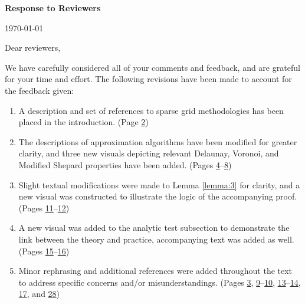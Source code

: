 
\setcounter{page}{0}\thispagestyle{empty}

{\huge \noindent \bf Response to Reviewers}
\vspace{.25cm}

\noindent \today
\vspace{1cm}

\noindent Dear reviewers,
\vspace{.25cm}

\noindent We have carefully considered all of your comments and feedback, and are grateful for your time and effort. The following revisions have been made to account for the feedback given:
\vspace{.25cm}

\begin{enumerate}[leftmargin=1cm]
  \setlength{\itemsep}{.4cm}
\item A description and set of references to sparse grid methodologies has been placed in the introduction. (Page \hyperlink{page.2}{2}) \label{review:item1}
\item The descriptions of approximation algorithms have been modified for greater clarity, and three new visuals depicting relevant Delaunay, Voronoi, and Modified Shepard properties have been added. (Pages \hyperlink{page.4}{4}--\hyperlink{page.8}{8}) \label{review:item2}
\item Slight textual modifications were made to Lemma \ref{lemma:3} for clarity, and a new visual was constructed to illustrate the logic of the accompanying proof. (Pages \hyperlink{page.11}{11}--\hyperlink{page.12}{12}) \label{review:item3}
\item A new visual was added to the analytic test subsection to demonstrate the link between the theory and practice, accompanying text was added as well. (Pages \hyperlink{page.15}{15}--\hyperlink{page.16}{16}) \label{review:item4}
\item Minor rephrasing and additional references were added throughout the text to address specific concerns and/or misunderstandings. (Pages \hyperlink{page.3}{3}, \hyperlink{page.9}{9}--\hyperlink{page.10}{10}, \hyperlink{page.13}{13}--\hyperlink{page.14}{14}, \hyperlink{page.17}{17}, and \hyperlink{page.28}{28}) \label{review:item5}
\end{enumerate}
\vspace{.7cm}

